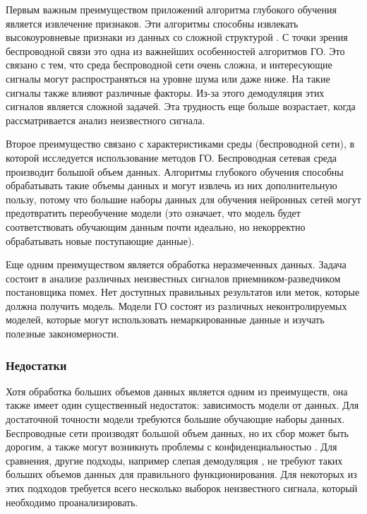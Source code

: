 Первым важным преимуществом приложений алгоритма глубокого обучения является извлечение признаков. Эти алгоритмы способны извлекать высокоуровневые признаки из данных со сложной структурой \cite{bigdataanal}. С точки зрения беспроводной связи это одна из важнейших особенностей алгоритмов ГО. Это связано с тем, что среда беспроводной сети очень сложна, и интересующие сигналы могут распространяться на уровне шума или даже ниже. На такие сигналы также влияют различные факторы. Из-за этого демодуляция этих сигналов является сложной задачей. Эта трудность еще больше возрастает, когда рассматривается анализ неизвестного сигнала.

Второе преимущество связано с характеристиками среды (беспроводной сети), в которой исследуется использование методов ГО. Беспроводная сетевая среда производит большой объем данных. Алгоритмы глубокого обучения способны обрабатывать такие объемы данных и могут извлечь из них дополнительную пользу, потому что большие наборы данных для обучения нейронных сетей могут предотвратить переобучение модели \cite{overfittingmeasument} (это означает, что модель будет соответствовать обучающим данным почти идеально, но некорректно обрабатывать новые поступающие данные).

Еще одним преимуществом является обработка неразмеченных данных. Задача состоит в анализе различных неизвестных сигналов приемником-разведчиком постановщика помех. Нет доступных правильных результатов или меток, которые должна получить модель. Модели ГО состоят из различных неконтролируемых моделей, которые могут использовать немаркированные данные и изучать полезные закономерности.

\subsubsection*{Недостатки}

Хотя обработка больших объемов данных является одним из преимуществ, она также имеет один существенный недостаток: зависимость модели от данных. Для достаточной точности модели требуются большие обучающие наборы данных. Беспроводные сети производят большой объем данных, но их сбор может быть дорогим, а также могут возникнуть проблемы с конфиденциальностью \cite{deeplearninmob}. Для сравнения, другие подходы, например слепая демодуляция \cite{blinddespreading}, не требуют таких больших объемов данных для правильного функционирования. Для некоторых из этих подходов требуется всего несколько выборок неизвестного сигнала, который необходимо проанализировать.

